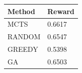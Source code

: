 \begin{tabular}{ll}
\hline
Method & Reward \\
\hline
  MCTS & 0.6617 \\
  RANDOM & 0.6547 \\
  GREEDY & 0.5398 \\
  GA & 0.6503 \\
\hline
\end{tabular}
